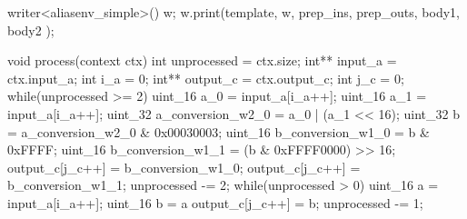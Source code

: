 \begin{code}
writer<aliasenv_simple>() w;
w.print(template, w, prep_ins, prep_outs, body1, body2 );
\end{code}

\mybeginfigloose
\begin{code}
void process(context ctx)
{
  int unprocessed = ctx.size;
  int** input_a = ctx.input_a; int i_a = 0;
  int** output_c = ctx.output_c; int j_c = 0;
  while(unprocessed >= 2)
  {
    uint_16 a_0 = input_a[i_a++];
    uint_16 a_1 = input_a[i_a++];
    uint_32 a_conversion_w2_0 = a_0 | (a_1 << 16);
    uint_32 b = a_conversion_w2_0 & 0x00030003;
    uint_16 b_conversion_w1_0 = b & 0xFFFF;
    uint_16 b_conversion_w1_1 = (b & 0xFFFF0000) >> 16;
    output_c[j_c++] = b_conversion_w1_0;
    output_c[j_c++] = b_conversion_w1_1;
    unprocessed -= 2;
  }
  while(unprocessed > 0)
  {
    uint_16 a = input_a[i_a++];
    uint_16 b = a %
    output_c[j_c++] = b;
    unprocessed -= 1;
  }
}
\end{code}

\FloatBarrier
